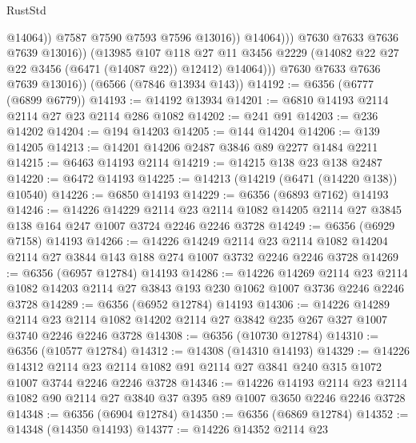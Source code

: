 \begin{lexlean}{RustStd}
\begin{coremodule}
                              @14064))
                          @7587
                          @7590
                          @7593
                          @7596
                          @13016))
                      @14064)))
                @7630
                @7633
                @7636
                @7639
                @13016))
            (@13985
              @107
              @118
              @27
              @11
              @3456
              @2229
              (@14082 @22 @27 @22 @3456 (@6471 (@14087 @22)) @12412)
              @14064)))
        @7630
        @7633
        @7636
        @7639
        @13016))
    (@6566 (@7846 @13934 @143))
@14192 := @6356 (@6777 (@6899 @6779))
@14193 := @14192 @13934
@14201 := @6810 @14193 @2114 @2114 @27 @23 @2114 @286 @1082
@14202 := @241 @91
@14203 := @236 @14202
@14204 := @194 @14203
@14205 := @144 @14204
@14206 := @139 @14205
@14213 := @14201 @14206 @2487 @3846 @89 @2277 @1484 @2211
@14215 := @6463 @14193 @2114
@14219 := @14215 @138 @23 @138 @2487
@14220 := @6472 @14193
@14225 := @14213 (@14219 (@6471 (@14220 @138)) @10540)
@14226 := @6850 @14193
@14229 := @6356 (@6893 @7162) @14193
@14246 := @14226
    @14229
    @2114
    @23
    @2114
    @1082
    @14205
    @2114
    @27
    @3845
    @138
    @164
    @247
    @1007
    @3724
    @2246
    @2246
    @3728
@14249 := @6356 (@6929 @7158) @14193
@14266 := @14226
    @14249
    @2114
    @23
    @2114
    @1082
    @14204
    @2114
    @27
    @3844
    @143
    @188
    @274
    @1007
    @3732
    @2246
    @2246
    @3728
@14269 := @6356 (@6957 @12784) @14193
@14286 := @14226
    @14269
    @2114
    @23
    @2114
    @1082
    @14203
    @2114
    @27
    @3843
    @193
    @230
    @1062
    @1007
    @3736
    @2246
    @2246
    @3728
@14289 := @6356 (@6952 @12784) @14193
@14306 := @14226
    @14289
    @2114
    @23
    @2114
    @1082
    @14202
    @2114
    @27
    @3842
    @235
    @267
    @327
    @1007
    @3740
    @2246
    @2246
    @3728
@14308 := @6356 (@10730 @12784)
@14310 := @6356 (@10577 @12784)
@14312 := @14308 (@14310 @14193)
@14329 := @14226
    @14312
    @2114
    @23
    @2114
    @1082
    @91
    @2114
    @27
    @3841
    @240
    @315
    @1072
    @1007
    @3744
    @2246
    @2246
    @3728
@14346 := @14226
    @14193
    @2114
    @23
    @2114
    @1082
    @90
    @2114
    @27
    @3840
    @37
    @395
    @89
    @1007
    @3650
    @2246
    @2246
    @3728
@14348 := @6356 (@6904 @12784)
@14350 := @6356 (@6869 @12784)
@14352 := @14348 (@14350 @14193)
@14377 := @14226
    @14352
    @2114
    @23

\end{coremodule}
\end{lexlean}
